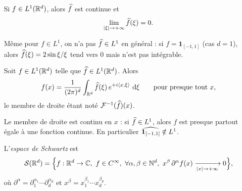 
\begin{proposition}\label{prop:riemann-lebesgue}
  Si $f\in L^1(\mathbb{R}^d)$, alors $\widehat{f}$ est continue et
  \[
    \lim_{\lvert \xi\rvert\to+\infty}\widehat{f}(\xi)=0 .
  \]
\end{proposition}

\begin{remark}
  Même pour $f\in L^1$, on n'a pas $\widehat{f}\in L^1$ en général : si $f=\mathbf 1_{[-1,1]}$ (cas $d=1$), alors $\widehat{f}(\xi)=2\sin\xi/\xi$ tend vers $0$ mais n'est pas intégrable.
\end{remark}

\begin{theorem}\label{thm:inversion}
  Soit $f\in L^1(\mathbb{R}^d)$ telle que $\widehat{f}\in L^1(\mathbb{R}^d)$. Alors
  \[
    f(x)=\frac{1}{(2\pi)^d}\int_{\mathbb{R}^d}\widehat{f}(\xi)\,e^{+i\langle x,\xi\rangle}\,\mathop{}\!\mathrm{d}\xi \qquad \text{pour presque tout } x,
  \]
  le membre de droite étant noté $\mathcal{F}^{-1}(\widehat{f})(x)$.
\end{theorem}


\begin{remark}
  Le membre de droite est continu en $x$ : si $\widehat{f}\in L^1$, alors $f$ est presque partout égale à une fonction continue. En particulier $\widehat{\mathbf 1_{[-1,1]}}\notin L^1$.
\end{remark}

\begin{definition}\label{def:schwartz}
  L'\emph{espace de Schwartz} est
  \[
    \mathcal{S}(\mathbb{R}^d)=\Bigl\{f:\mathbb{R}^d\to\mathbb{C},\ f\in C^\infty,\ \forall\alpha,\beta\in\mathbb{N}^d,\ x^\beta\,\partial^\alpha f(x)\xrightarrow[\lvert x\rvert\to+\infty]{}0\Bigr\},
  \]
  où $\partial^\alpha=\partial_1^{\alpha_1}\cdots\partial_d^{\alpha_d}$ et $x^\beta=x_1^{\beta_1}\cdots x_d^{\beta_d}$.
\end{definition}

